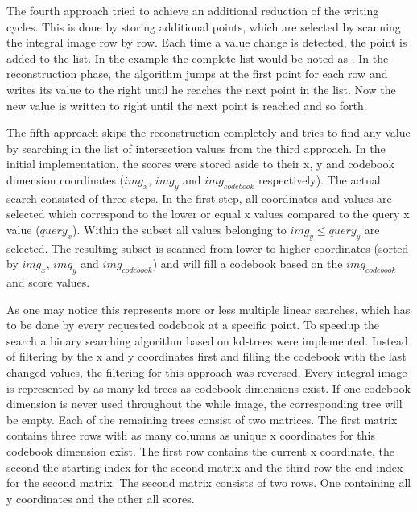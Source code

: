 The fourth approach tried to achieve an additional reduction of the writing cycles. This is done by storing additional points, which are selected by scanning the integral image row by row. Each time a value change is detected, the point is added to the list. In the example the complete list would be noted as . In the reconstruction phase, the algorithm jumps at the first point for each row and writes its value to the right until he reaches the next point in the list. Now the new value is written to right until the next point is reached and so forth.

The fifth approach skips the reconstruction completely and tries to find any value by searching in the list of intersection values from the third approach. In the initial implementation, the scores were stored aside to their x, y and codebook dimension coordinates ($img_x$, $img_y$ and $img_{codebook}$ respectively). The actual search consisted of three steps. In the first step, all coordinates and values are selected which correspond to the lower or equal x values compared to the query x value ($query_x$). Within the subset all values belonging to $img_y \le query_y$ are selected. The resulting subset is scanned from lower to higher coordinates (sorted by $img_x$, $img_y$ and $img_{codebook}$) and will fill a codebook based on the $img_{codebook}$ and score values.

As one may notice this represents more or less multiple linear searches, which has to be done by every requested codebook at a specific point. To speedup the search a binary searching algorithm based on kd-trees were implemented. %
Instead of filtering by the x and y coordinates first and filling the codebook with the last changed values, the filtering for this approach was reversed. Every integral image is represented by as many kd-trees as codebook dimensions exist. If one codebook dimension is never used throughout the while image, the corresponding tree will be empty. Each of the remaining trees consist of two matrices. The first matrix contains three rows with as many columns as unique x coordinates for this codebook dimension exist. The first row contains the current x coordinate, the second the starting index for the second matrix and the third row the end index for the second matrix. The second matrix consists of two rows. One containing all y coordinates and the other all scores.

